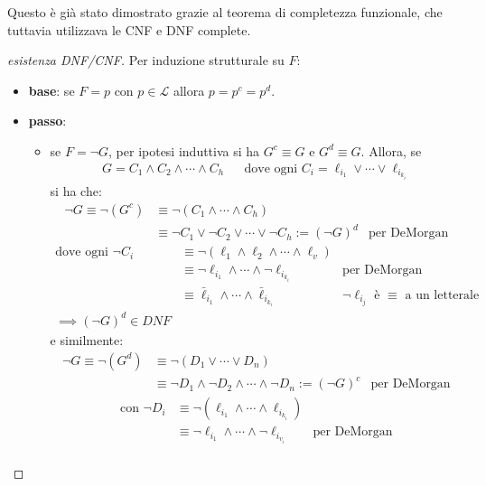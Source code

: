 Questo è già stato dimostrato grazie al teorema di completezza funzionale, che tuttavia utilizzava le CNF e DNF complete. 
\begin{proof}[esistenza DNF/CNF]
Per induzione strutturale su $F$:
\begin{itemize}
  \item \textbf{base}: se $F = p$ con $p \in \mathscr{L}$ allora $p = p^c = p^d$.
  \item \textbf{passo}:
    \begin{itemize}
      \item se $F = \neg G$, per ipotesi induttiva si ha $G^c \equiv G$ e $G^d \equiv G$. 
        Allora, se
        \begin{align*}
           G = C_1 \land C_2 \land \cdots \land C_h &&
          \text{dove ogni } C_i = \ell_{i_1} \lor \cdots \lor \ell_{i_{k_i}}
        \end{align*}
        si ha che:
        \begin{align*}
          \neg G \equiv \neg (G^c) & \equiv \neg (C_1 \land \cdots \land C_h) \\
                   & \equiv \neg C_1 \lor \neg C_2 \lor \cdots \lor \neg C_h := (\neg G)^d & \text{per DeMorgan}
        \end{align*}
        \begin{align*}
          \text{dove ogni } \neg C_i & \equiv \neg (\ell_1 \land \ell_2 \land \cdots \land \ell_v) \\
                               & \equiv \neg \ell_{i_1} \land \cdots \land \neg \ell_{i_{k_i}} & \text{per DeMorgan} \\
                               & \equiv \bar \ell_{i_1} \land \cdots \land \bar \ell_{i_{k_i}} & \neg \ell_{i_j} \text{ è } \equiv \text{ a un letterale opposto} \\
          \implies (\neg G)^d \in DNF 
        \end{align*}
        e similmente:
        \begin{align*}
          \neg G \equiv \neg (G^d) & \equiv \neg (D_1 \lor \cdots \lor D_n) \\
                   & \equiv \neg D_1 \land \neg D_2 \land \cdots \land \neg D_n := (\neg G)^c & \text{per DeMorgan}
        \end{align*}
        \begin{align*}
          \text{con } \neg D_i & \equiv \neg (\ell_{i_1} \land \cdots \land \ell_{i_{k_i}}) \\
                               & \equiv \neg \ell_{i_1} \land \cdots \land \neg \ell_{i_{v_i}} & \text{per DeMorgan} \\

\end{align*}
\end{itemize}
\end{itemize}
\end{proof}
